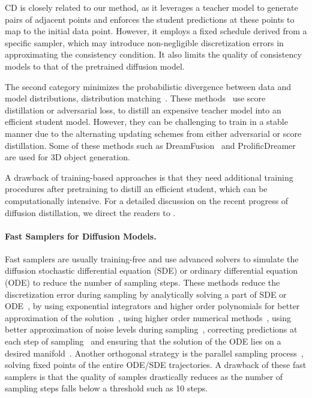CD is closely related to our method, as it leverages a teacher model to generate pairs of adjacent points and enforces the student predictions at these points to map to the initial data point. However, it employs a fixed schedule derived from a specific sampler, which may introduce non-negligible discretization errors in approximating the consistency condition. It also limits the quality of consistency models to that of the pretrained diffusion model. 

The second category minimizes the probabilistic divergence between data and model distributions, \ie distribution matching~\citep{poole2022dreamfusion,wang2024prolificdreamer,di,yin2023one,sid}. These methods~\citep{di,yin2023one,nguyen2023swiftbrush,sauer2023adversarial,kohler2024imagine,xu2023ufogen,lin2024sdxl,zhou2024long} use score distillation or adversarial loss, to distill an expensive teacher model into an efficient student model. However, they can be challenging to train in a stable manner due to the alternating updating schemes from either adversarial or score distillation. Some of these methods such as DreamFusion~\citep{poole2022dreamfusion} and ProlificDreamer~\citep{wang2024prolificdreamer} are used for 3D object generation.  

A drawback of training-based approaches is that they need additional training procedures after pretraining to distill an efficient student, which can be computationally intensive. For a detailed discussion on the recent progress of diffusion distillation, we direct the readers to \citet{dieleman2024distillation}.

\vspace{-5pt}
\paragraph{Fast Samplers for Diffusion Models.}
Fast samplers are usually training-free and use advanced solvers to simulate the diffusion stochastic differential equation (SDE) or ordinary differential equation (ODE) to reduce the number of sampling steps. These methods reduce the discretization error during sampling by analytically solving a part of SDE or ODE~\citep{lu2022dpm,lu2022dpmplus,xue2024sa}, by using exponential integrators and higher order polynomials for better approximation of the solution~\citep{zhang2022fast}, using higher order numerical methods~\citep{Karras2022edm}, using better approximation of noise levels during sampling~\citep{kong2021fast}, correcting predictions at each step of sampling~\citep{zhao2024unipc} and ensuring that the solution of the ODE lies on a desired manifold~\citep{liu2022pseudo}. 
Another orthogonal strategy is the parallel sampling process~\citep{pokle2022deep,shih2024parallel}, solving fixed points of the entire ODE/SDE trajectories. A drawback of these fast samplers is that the quality of samples drastically reduces as the number of sampling steps falls below a threshold such as 10 steps.
